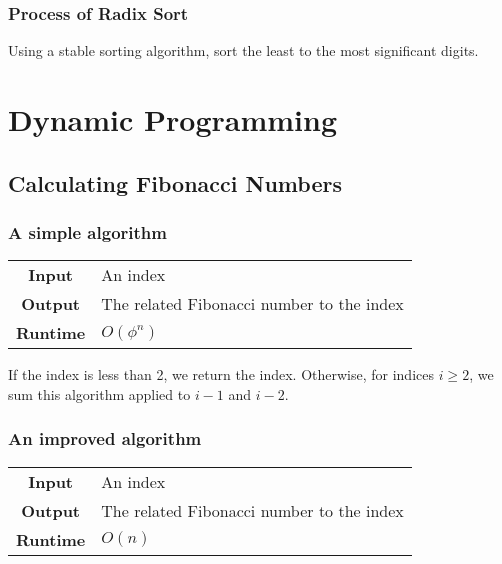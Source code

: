 \documentclass[a4paper, 12pt, twoside]{article}
\begin{document}
\subsubsection{Process of Radix Sort}

Using a stable sorting algorithm, sort the least to the most
significant digits.

\section{Dynamic Programming}

\subsection{Calculating Fibonacci Numbers}

\subsubsection{A simple algorithm}

\begin{center}
      \begin{tabular}{ || c | p{8.5cm} || }
            \hline
                  \textbf{Input} & An index \\
                  \textbf{Output} & The related Fibonacci number
                        to the index \\
            \hline\hline
                  \textbf{Runtime} & $O(\phi^n)$ \\
            \hline
      \end{tabular}
\end{center}

If the index is less than 2, we return the index. Otherwise,
for indices $i \geq 2$, we sum this algorithm applied to $i - 1$
and $i - 2$.

\subsubsection{An improved algorithm}

\begin{center}
      \begin{tabular}{ || c | p{8.5cm} || }
            \hline
                  \textbf{Input} & An index \\
                  \textbf{Output} & The related Fibonacci number
                        to the index \\
            \hline\hline
                  \textbf{Runtime} & $O(n)$ \\
            \hline
      \end{tabular}
\end{center}
\end{document}

